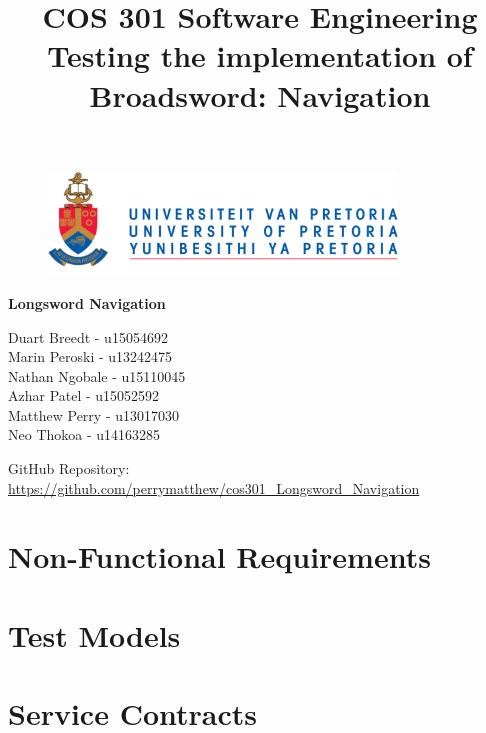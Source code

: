 \documentclass{article}
\begin{document}
		\begin{figure}[t]
			\centering
			\includegraphics[width=350px]{UP_Logo.PNG}
		\end{figure}
			\title{COS 301 Software Engineering\\ Testing the implementation of Broadsword: Navigation}
\maketitle
		\begin{center}
			\textbf{\newline Longsword Navigation} \\
		\end{center}
				
		\begin{center}
		 \large
			Duart Breedt - u15054692\\			
			Marin Peroski - u13242475\\
			Nathan Ngobale -  u15110045\\
			Azhar Patel - u15052592\\
			Matthew Perry - u13017030\\
			Neo Thokoa - u14163285\\
		\end{center}
		
		GitHub Repository: \href{https://github.com/perrymatthew/cos301_Longsword_Navigation}\\
		\url{https://github.com/perrymatthew/cos301_Longsword_Navigation}

\clearpage
\tableofcontents
\clearpage

\section{Non-Functional Requirements}
	
\clearpage
	
\section{Test Models}
	
\clearpage

\section{Service Contracts}
	
\end{document}

